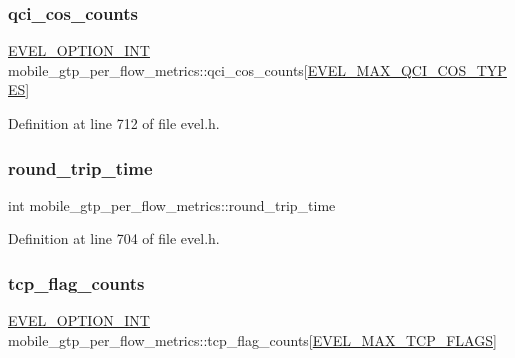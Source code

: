 \subsubsection{\texorpdfstring{qci\+\_\+cos\+\_\+counts}{qci\_cos\_counts}}
{\footnotesize\ttfamily \hyperlink{evel_8h_a452d825778d1c2368a54b8f689a25ba7}{E\+V\+E\+L\+\_\+\+O\+P\+T\+I\+O\+N\+\_\+\+I\+NT} mobile\+\_\+gtp\+\_\+per\+\_\+flow\+\_\+metrics\+::qci\+\_\+cos\+\_\+counts\mbox{[}\hyperlink{evel_8h_a2018881529f1dfb73c8b2689f5193c86a6715c1121b0a9793b2e8f5e03df35994}{E\+V\+E\+L\+\_\+\+M\+A\+X\+\_\+\+Q\+C\+I\+\_\+\+C\+O\+S\+\_\+\+T\+Y\+P\+ES}\mbox{]}}



Definition at line 712 of file evel.\+h.

\hypertarget{structmobile__gtp__per__flow__metrics_a7f386f878d1f286708a6b3994e53352b}{}\label{structmobile__gtp__per__flow__metrics_a7f386f878d1f286708a6b3994e53352b} 
\subsubsection{\texorpdfstring{round\+\_\+trip\+\_\+time}{round\_trip\_time}}
{\footnotesize\ttfamily int mobile\+\_\+gtp\+\_\+per\+\_\+flow\+\_\+metrics\+::round\+\_\+trip\+\_\+time}



Definition at line 704 of file evel.\+h.

\hypertarget{structmobile__gtp__per__flow__metrics_ab05402d6fdb636e226db3377ef3bea2c}{}\label{structmobile__gtp__per__flow__metrics_ab05402d6fdb636e226db3377ef3bea2c} 
\subsubsection{\texorpdfstring{tcp\+\_\+flag\+\_\+counts}{tcp\_flag\_counts}}
{\footnotesize\ttfamily \hyperlink{evel_8h_a452d825778d1c2368a54b8f689a25ba7}{E\+V\+E\+L\+\_\+\+O\+P\+T\+I\+O\+N\+\_\+\+I\+NT} mobile\+\_\+gtp\+\_\+per\+\_\+flow\+\_\+metrics\+::tcp\+\_\+flag\+\_\+counts\mbox{[}\hyperlink{evel_8h_aeabdcbed22ac53495bea50059b06c993a9905d0291a16b01765e97eb3abb7afb2}{E\+V\+E\+L\+\_\+\+M\+A\+X\+\_\+\+T\+C\+P\+\_\+\+F\+L\+A\+GS}\mbox{]}}



